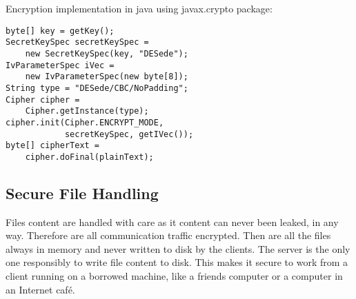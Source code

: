 Encryption implementation in java using javax.crypto package:
\begin{lstlisting}[frame=single]
byte[] key = getKey();
SecretKeySpec secretKeySpec = 
    new SecretKeySpec(key, "DESede");
IvParameterSpec iVec = 
    new IvParameterSpec(new byte[8]);
String type = "DESede/CBC/NoPadding";
Cipher cipher = 
    Cipher.getInstance(type);
cipher.init(Cipher.ENCRYPT_MODE, 
            secretKeySpec, getIVec());
byte[] cipherText = 
    cipher.doFinal(plainText);
\end{lstlisting}

\subsection{Secure File Handling}

Files content are handled with care as it content can never been leaked, in any way. Therefore are all communication traffic encrypted. Then are all the files always in memory and never written to disk by the clients. The server is the only one responsibly to write file content to disk. This makes it secure to work from a client running on a borrowed machine, like a friends computer or a computer in an Internet café. 
